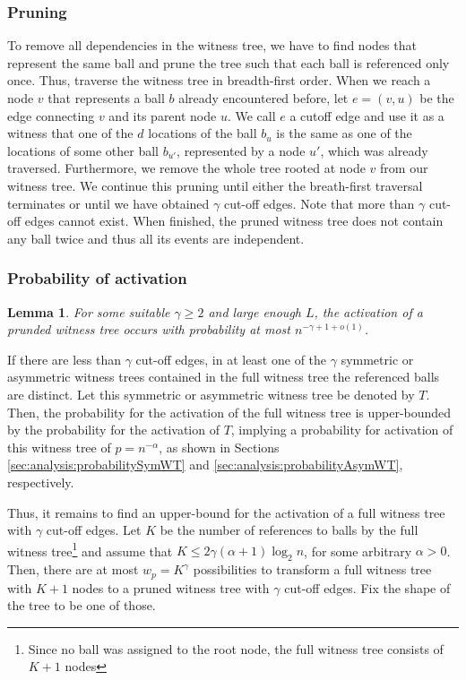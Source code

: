 \documentclass[a4paper,12pt]{article}
\newtheorem{lemma}{Lemma}
\begin{document}
\subsubsection{Pruning}
\label{sec:analysis:pruningFullWT}
To remove all dependencies in the witness tree, we have to find nodes that represent the same ball and prune the tree such that each ball is referenced only once. Thus, traverse the witness tree in breadth-first order. When we reach a node $v$ that represents a ball $b$ already encountered before, let $e = (v,u)$ be the edge connecting $v$ and its parent node $u$. We call $e$ a cutoff edge and use it as a witness that one of the $d$ locations of the ball $b_u$ is the same as one of the locations of some other ball $b_{u'}$, represented by a node $u'$, which was already traversed. Furthermore, we remove the whole tree rooted at node $v$ from our witness tree. We continue this pruning until either the breath-first traversal terminates or until we have obtained $\gamma$ cut-off edges. Note that more than $\gamma$ cut-off edges cannot exist. When finished, the pruned witness tree does not contain any ball twice and thus all its events are independent. 

\subsubsection{Probability of activation}
\label{sec:analysis:probabilityFullWT}
\begin{lemma}\label{lemma:fwt:activation}
For some suitable $\gamma \geq 2$ and large enough $L$, the activation of a prunded witness tree occurs with probability at most $n^{-\gamma +1 +o(1)}$.
\end{lemma}
If there are less than $\gamma$ cut-off edges, in at least one of the $\gamma$ symmetric or asymmetric witness trees contained in the full witness tree the referenced balls are distinct. Let this symmetric or asymmetric witness tree be denoted by $T$. Then, the probability for the activation of the full witness tree is upper-bounded by the probability for the activation of $T$, implying a probability for activation of this witness tree of $p = n^{- \alpha}$, as shown in Sections \ref{sec:analysis:probabilitySymWT} and \ref{sec:analysis:probabilityAsymWT}, respectively.

Thus, it remains to find an upper-bound for the activation of a full witness tree with $\gamma$ cut-off edges. Let $K$ be the number of references to balls by the full witness tree\footnote{Since no ball was assigned to the root node, the full witness tree consists of $K+1$ nodes} and assume that $K  \leq 2 \gamma\left(\alpha+1\right) \log_2 n$, for some arbitrary $\alpha > 0$. Then, there are at most $w_p=K^\gamma$ possibilities to transform a full witness tree with $K+1$ nodes to a pruned witness tree with $\gamma$ cut-off edges. Fix the shape of the tree to be one of those. 
\end{document}
